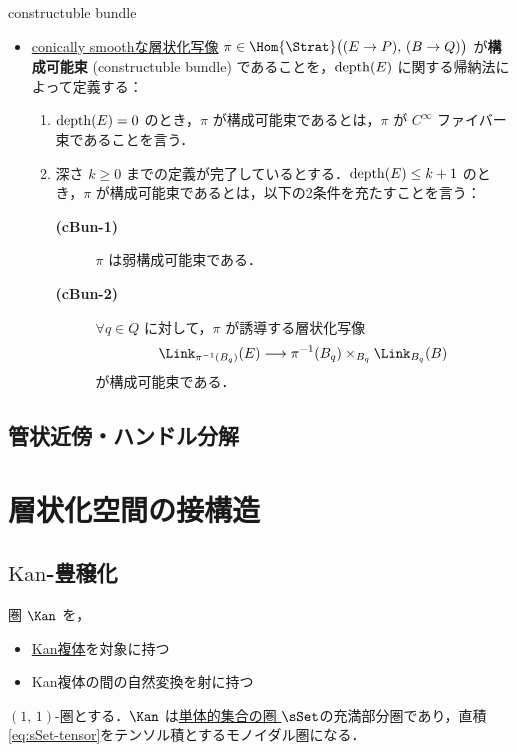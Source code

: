\documentclass[TQFT_main]{subfiles}
\begin{document}
\begin{mydef}[label=def:cbl,breakable]{constructuble bundle}
\begin{itemize}
        \item  \hyperref[def:c-smooth-map]{conically smoothな層状化写像} $\pi \in \Hom{\Strat}\bigl( (E \to P),\, (B \to Q) \bigr)$ が\textbf{構成可能束} (constructuble bundle) であることを，\hyperref[def:dim-depth]{$\operatorname{depth} (E)$} に関する帰納法によって定義する：
        \begin{enumerate}
            \item $\operatorname{depth} (E) = 0$ のとき，$\pi$ が構成可能束であるとは，$\pi$ が $C^\infty$ ファイバー束であることを言う．
            \item 深さ $k \ge 0$ までの定義が完了しているとする．$\operatorname{depth}(E) \le k+1$ のとき，$\pi$ が構成可能束であるとは，以下の2条件を充たすことを言う：
            \begin{description}
                \item[\textbf{(cBun-1)}] $\pi$ は弱構成可能束である．
                \item[\textbf{(cBun-2)}] $\forall q \in Q$ に対して，$\pi$ が誘導する層状化写像
                \begin{align}
                    \Link_{\pi^{-1}(B_q)} (E) \lto \pi^{-1}(B_q) \times_{B_q} \Link_{B_q} (B)
                \end{align}
                が構成可能束である．
            \end{description}
        \end{enumerate}
    \end{itemize}
\end{mydef}


\subsection{管状近傍・ハンドル分解}

\section{層状化空間の接構造}

\subsection{$\mathrm{Kan}$-豊穣化}

圏 $\Kan$ を，
\begin{itemize}
    \item \hyperref[def:KanCplx]{Kan複体}を対象に持つ
    \item Kan複体の間の自然変換を射に持つ
\end{itemize}
$(1,\, 1)$-圏とする．$\Kan$ は\hyperref[def:SimpSet]{単体的集合の圏 $\sSet$}の充満部分圏であり，直積\eqref{eq:sSet-tensor}をテンソル積とするモノイダル圏になる．
\end{document}
